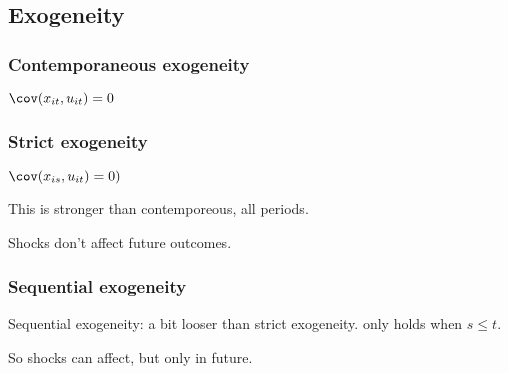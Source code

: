 
\subsection{Exogeneity}

\subsubsection{Contemporaneous exogeneity}

\(\cov(x_{it},u_{it})=0\)

\subsubsection{Strict exogeneity}

\(\cov (x_{is}, u_{it})=0)\)

This is stronger than contemporeous, all periods.

Shocks don't affect future outcomes.

\subsubsection{Sequential exogeneity}

Sequential exogeneity: a bit looser than strict exogeneity. only holds when \(s\le t\).

So shocks can affect, but only in future.

